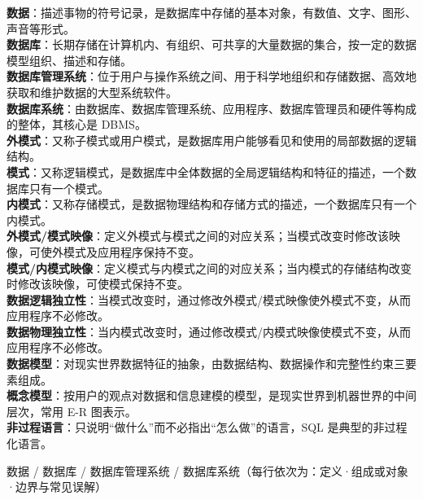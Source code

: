\documentclass[a4paper,11pt]{article}
\begin{document}
\begin{keyterms}
\textbf{数据}：描述事物的符号记录，是数据库中存储的基本对象，有数值、文字、图形、声音等形式。\\
\textbf{数据库}：长期存储在计算机内、有组织、可共享的大量数据的集合，按一定的数据模型组织、描述和存储。\\
\textbf{数据库管理系统}：位于用户与操作系统之间、用于科学地组织和存储数据、高效地获取和维护数据的大型系统软件。\\
\textbf{数据库系统}：由数据库、数据库管理系统、应用程序、数据库管理员和硬件等构成的整体，其核心是 DBMS。\\
\textbf{外模式}：又称子模式或用户模式，是数据库用户能够看见和使用的局部数据的逻辑结构。\\
\textbf{模式}：又称逻辑模式，是数据库中全体数据的全局逻辑结构和特征的描述，一个数据库只有一个模式。\\
\textbf{内模式}：又称存储模式，是数据物理结构和存储方式的描述，一个数据库只有一个内模式。\\
\textbf{外模式/模式映像}：定义外模式与模式之间的对应关系；当模式改变时修改该映像，可使外模式及应用程序保持不变。\\
\textbf{模式/内模式映像}：定义模式与内模式之间的对应关系；当内模式的存储结构改变时修改该映像，可使模式保持不变。\\
\textbf{数据逻辑独立性}：当模式改变时，通过修改外模式/模式映像使外模式不变，从而应用程序不必修改。\\
\textbf{数据物理独立性}：当内模式改变时，通过修改模式/内模式映像使模式不变，从而应用程序不必修改。\\
\textbf{数据模型}：对现实世界数据特征的抽象，由数据结构、数据操作和完整性约束三要素组成。\\
\textbf{概念模型}：按用户的观点对数据和信息建模的模型，是现实世界到机器世界的中间层次，常用 E-R 图表示。\\
\textbf{非过程语言}：只说明“做什么”而不必指出“怎么做”的语言，SQL 是典型的非过程化语言。
\end{keyterms}

\begin{contrast}{数据 / 数据库 / 数据库管理系统 / 数据库系统（每行依次为：定义·组成或对象·边界与常见误解）}
\end{contrast}
\end{document}
